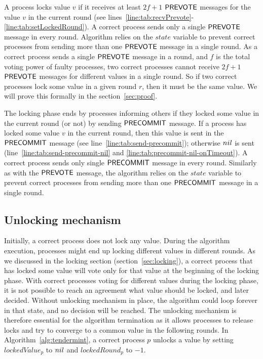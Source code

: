A process locks value $v$ if it receives at least $2f+1$ $\mathsf{PREVOTE}$ messages for the value $v$ in the current round (see lines~\ref{line:tab:recvPrevote}-\ref{line:tab:setLockedRound}). A correct process sends only a single $\mathsf{PREVOTE}$ message in every round. Algorithm relies on the $state$ variable to prevent correct processes from sending more than one $\mathsf{PREVOTE}$ message in a single round. As a correct process sends a single $\mathsf{PREVOTE}$ message in a round, and $f$ is the total voting power of faulty processes, two correct processes cannot receive $2f+1$ $\mathsf{PREVOTE}$ messages for different values in a single round. So if two correct processes lock some value in a given round $r$, then it must be the same value. We will prove this formally in the section~\ref{sec:proof}.    

The locking phase ends by processes informing others if they locked some value in the current round (or not) by sending $\mathsf{PRECOMMIT}$ message. If a process has locked some value $v$ in the current round, then this value is sent in the $\mathsf{PRECOMMIT}$ message (see line~\ref{line:tab:send-precommit}); otherwise $nil$ is sent (line~\ref{line:tab:send-precommit-nil} and \ref{line:tab:precommit-nil-onTimeout}). A correct process sends only single $\mathsf{PRECOMMIT}$ message in every round. Similarly as with the $\mathsf{PREVOTE}$ message, the algorithm relies on the $state$ variable to prevent correct processes from sending more than one $\mathsf{PRECOMMIT}$ message in a single round. 

\subsection{Unlocking mechanism}
\label{sec:unlocking}

Initially, a correct process does not lock any value. During the algorithm execution, processes might end up locking different values in different rounds. As we discussed in the locking section (section~\ref{sec:locking}), a correct process that has locked some value will vote
only for that value at the beginning of the locking phase. With correct processes voting for different values during the locking phase, it is not possible to reach an agreement what value should be locked, and later decided. Without unlocking mechanism in place, the algorithm could loop forever in that state, and no decision will be reached. The unlocking mechanism is therefore essential for the algorithm termination as it allows processes to release locks and try to converge to a common value in the following rounds. In Algorithm~\ref{alg:tendermint}, a correct process $p$ unlocks a value by setting $lockedValue_p$ to $nil$ and $lockedRound_p$ to $-1$. 

